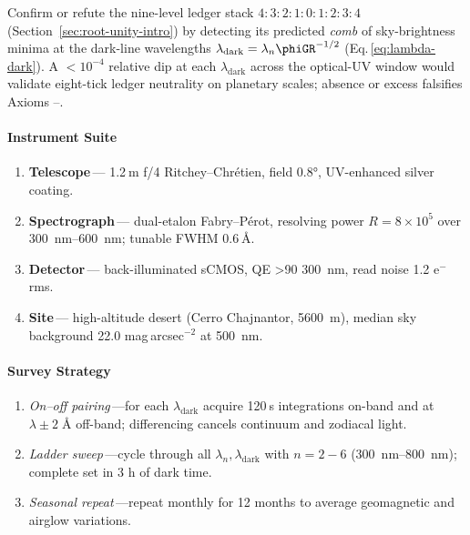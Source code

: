 \documentclass[11pt,oneside]{book}
\begin{document}
{Confirm or refute the nine-level ledger stack
\(4{:}3{:}2{:}1{:}0{:}1{:}2{:}3{:}4\)
(Section~\ref{sec:root-unity-intro})
by detecting its predicted \emph{comb} of sky-brightness minima at the
dark-line wavelengths
\(
   \lambda_{\text{dark}}=\lambda_{n}\phiGR^{-1/2}
\)
(Eq.\,\ref{eq:lambda-dark}).
A $<\!10^{-4}$ relative dip at each $\lambda_{\text{dark}}$ across the
optical-UV window would validate eight-tick ledger neutrality on
planetary scales; absence or excess falsifies Axioms
–.

\paragraph{Instrument Suite}

\begin{enumerate}[leftmargin=*,itemsep=4pt]
\item \textbf{Telescope}\,—
      1.2 m f/4 Ritchey–Chrétien, field 0.8°,
      UV-enhanced silver coating.
\item \textbf{Spectrograph}\,—
      dual-etalon Fabry–Pérot, resolving power
      \(R\!=\!8\times10^{5}\)
      over \SIrange{300}{600}{\nano\metre};
      tunable FWHM 0.6 Å.
\item \textbf{Detector}\,—
      back-illuminated sCMOS, QE >90 %
      \SI{300}{\nano\metre}, read noise 1.2 e\(^{-}\) rms.
\item \textbf{Site}\,—
      high-altitude desert (Cerro Chajnantor,
      \SI{5600}{\metre}), median sky background
      22.0 mag arcsec\(^{-2}\) at \SI{500}{\nano\metre}.
\end{enumerate}

\paragraph{Survey Strategy}

\begin{enumerate}[label=\textbf{S\arabic*},leftmargin=*,itemsep=4pt]
\item \emph{On–off pairing}\,—for each
      \(\lambda_{\text{dark}}\) acquire
      120 s integrations on-band and at
      \(\lambda\pm2\;\text{Å}\) off-band; differencing
      cancels continuum and zodiacal light.
\item \emph{Ladder sweep}\,—cycle through all
      \(\lambda_{n},\lambda_{\text{dark}}\) with
      \(n=2\!-\!6\)
      (\SIrange{300}{800}{\nano\metre});
      complete set in 3 h of dark time.
\item \emph{Seasonal repeat}\,—repeat monthly for 12 months
      to average geomagnetic and airglow variations.
\end{enumerate}

}
\end{document}
